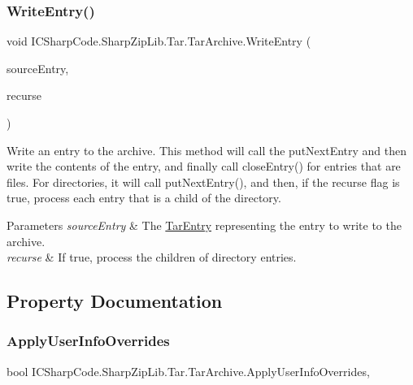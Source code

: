 \subsubsection{\texorpdfstring{Write\+Entry()}{WriteEntry()}}
{\footnotesize\ttfamily void I\+C\+Sharp\+Code.\+Sharp\+Zip\+Lib.\+Tar.\+Tar\+Archive.\+Write\+Entry (\begin{DoxyParamCaption}\item[{\hyperlink{class_i_c_sharp_code_1_1_sharp_zip_lib_1_1_tar_1_1_tar_entry}{Tar\+Entry}}]{source\+Entry,  }\item[{bool}]{recurse }\end{DoxyParamCaption})\hspace{0.3cm}{\ttfamily [inline]}}



Write an entry to the archive. This method will call the put\+Next\+Entry and then write the contents of the entry, and finally call close\+Entry() for entries that are files. For directories, it will call put\+Next\+Entry(), and then, if the recurse flag is true, process each entry that is a child of the directory. 


\begin{DoxyParams}{Parameters}
{\em source\+Entry} & The \hyperlink{class_i_c_sharp_code_1_1_sharp_zip_lib_1_1_tar_1_1_tar_entry}{Tar\+Entry} representing the entry to write to the archive. \\
\hline
{\em recurse} & If true, process the children of directory entries. \\
\hline
\end{DoxyParams}


\subsection{Property Documentation}
\mbox{\label{class_i_c_sharp_code_1_1_sharp_zip_lib_1_1_tar_1_1_tar_archive_a94d90eb52245f63a5ad06fb0289104ff}} 
\subsubsection{\texorpdfstring{Apply\+User\+Info\+Overrides}{ApplyUserInfoOverrides}}
{\footnotesize\ttfamily bool I\+C\+Sharp\+Code.\+Sharp\+Zip\+Lib.\+Tar.\+Tar\+Archive.\+Apply\+User\+Info\+Overrides\hspace{0.3cm}{\ttfamily [get]}, {\ttfamily [set]}}



